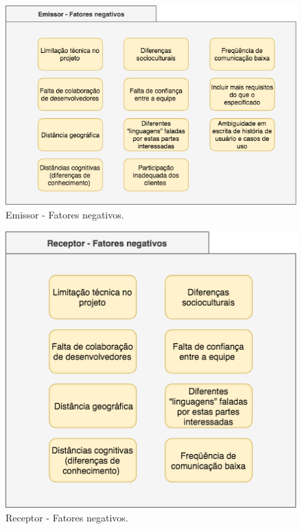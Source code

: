 \begin{figure}[h!] %
	\begin{center}
	    \caption{Emissor - Fatores negativos.}
	    \label{fig:quadro5}
	    \includegraphics[scale=0.55]{figuras/quadro5} %
	\end{center}
	
\end{figure}
\begin{figure}[h!] %

	\begin{center}
	    \caption{Receptor - Fatores negativos.}
	    	\label{fig:quadro6}
	    \includegraphics[scale=0.55]{figuras/quadro6} %
	\end{center}

\end{figure}

